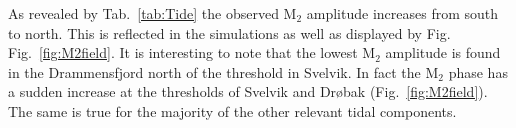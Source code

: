 As revealed by Tab.~\ref{tab:Tide} the observed M$_2$ amplitude increases from south to north. This is reflected in the simulations as well as displayed by Fig. Fig.~\ref{fig:M2field}. It is interesting to note that the lowest M$_2$ amplitude is found in the Drammensfjord north of the threshold in Svelvik. In fact the M$_2$ phase has a sudden increase at the thresholds of Svelvik and Dr{\o}bak (Fig.~\ref{fig:M2field}). The same is true for the majority of the other relevant tidal components.


